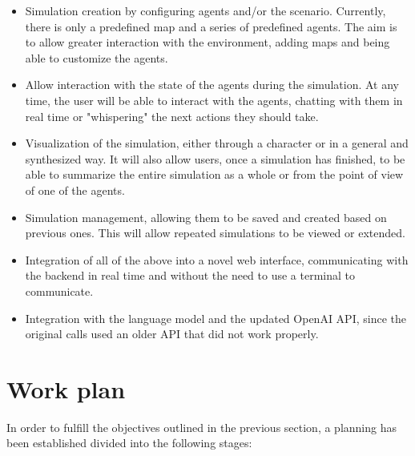 \begin{itemize}
	\item Simulation creation by configuring agents and/or the scenario. Currently, there is only a predefined map and a series of predefined agents. The aim is to allow greater interaction with the environment, adding maps and being able to customize the agents.
	
	\item Allow interaction with the state of the agents during the simulation. At any time, the user will be able to interact with the agents, chatting with them in real time or "whispering" the next actions they should take.
	
	\item Visualization of the simulation, either through a character or in a general and synthesized way. It will also allow users, once a simulation has finished, to be able to summarize the entire simulation as a whole or from the point of view of one of the agents.
	
	\item Simulation management, allowing them to be saved and created based on previous ones. This will allow repeated simulations to be viewed or extended.
	
	\item Integration of all of the above into a novel web interface, communicating with the backend in real time and without the need to use a terminal to communicate.
	
	\item Integration with the language model and the updated OpenAI API, since the original calls used an older API that did not work properly.
	
\end{itemize}

\section*{Work plan}

In order to fulfill the objectives outlined in the previous section, a planning has been established divided into the following stages:

